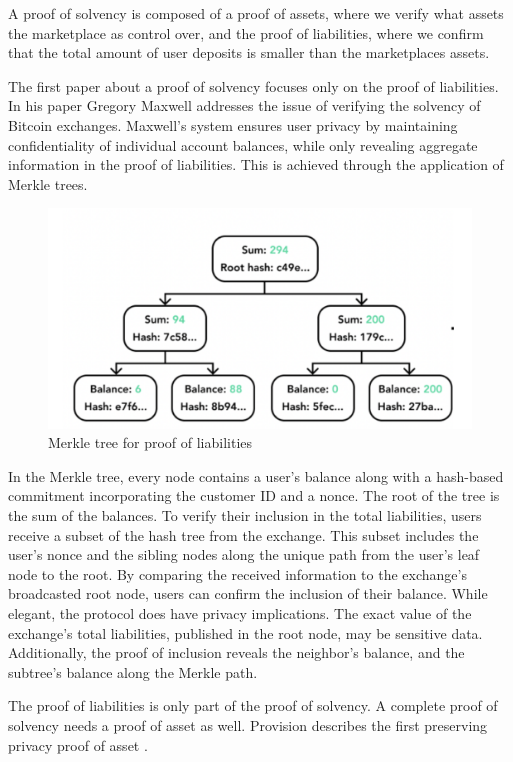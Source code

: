 A proof of solvency is composed of a proof of assets, where we verify what assets the marketplace as control over, and the proof of liabilities,
where we confirm that the total amount of user deposits is smaller than the marketplaces assets.

The first paper about a proof of solvency focuses only on the proof of liabilities. In his paper Gregory Maxwell addresses the issue of verifying
the solvency of Bitcoin exchanges. \cite{chainlink_blog}
Maxwell's system ensures user privacy by maintaining confidentiality of individual account balances, while only revealing aggregate information in the proof of liabilities.
This is achieved through the application of Merkle trees.


\begin{figure}[H]
\centering
\includegraphics[width=130mm]{MerkleTreeLiabilities.png}
\caption{Merkle tree for proof of liabilities}
\label{overflow}
\end{figure}


In the Merkle tree, every node contains a user's balance along with a hash-based commitment incorporating the customer ID and a nonce. The root of the tree is the sum of the balances.
To verify their inclusion in the total liabilities, users receive a subset of the hash tree from the exchange. This subset includes the user's nonce and the sibling nodes along the unique path from the user's leaf node to the root.
By comparing the received information to the exchange's broadcasted root node, users can confirm the inclusion of their balance.
While elegant, the protocol does have privacy implications. The exact value of the exchange's total liabilities, published in the root node, may be sensitive data.
Additionally, the proof of inclusion reveals the neighbor's balance, and the subtree's balance along the Merkle path.

The proof of liabilities is only part of the proof of solvency. A complete proof of solvency needs a proof of asset as well.
Provision describes the first preserving privacy proof of asset \cite{DBBBCC15}.

